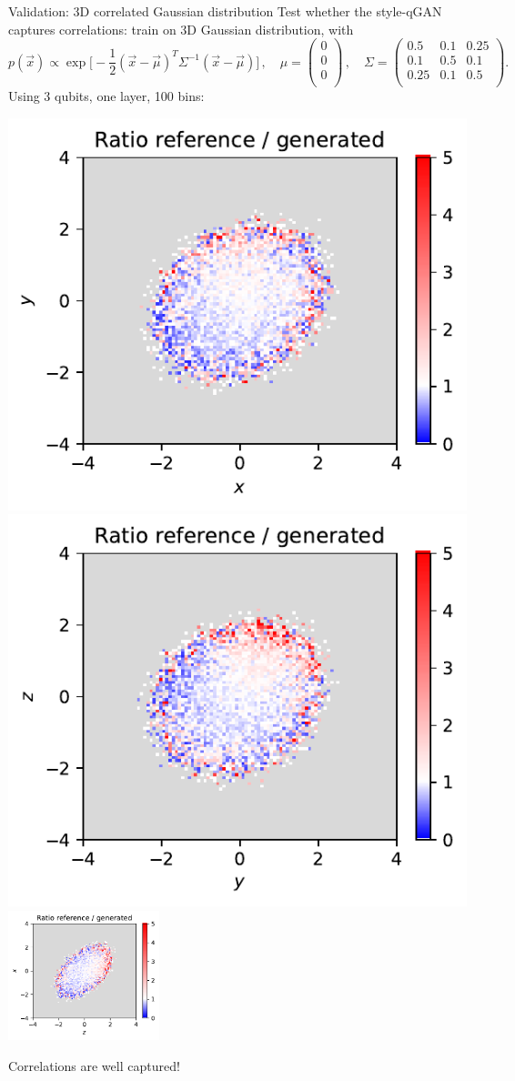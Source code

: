 \documentclass[11pt,aspectratio=169]{beamer}
\begin{document}
\begin{frame}{Validation: 3D correlated Gaussian distribution}
    Test whether the style-qGAN captures correlations: train on 3D Gaussian distribution, with
    \begin{equation*}
        p(\vec{x}) \propto \exp \Big[ - \frac{1}{2} (\vec{x} - \vec{\mu})^T
        \Sigma^{-1} (\vec{x} - \vec{\mu}) \Big] \,, \quad
        \mu =
\begin{pmatrix}
  0 \\
  0 \\
  0 \\
  \end{pmatrix}\,, \quad
        \Sigma =
\begin{pmatrix}
  0.5 & 0.1 & 0.25\\
  0.1 & 0.5 & 0.1\\
  0.25 & 0.1 & 0.5\\
  \end{pmatrix}.
    \end{equation*}
    Using 3 qubits, one layer, 100 bins:
    \begin{multicols*}{3}
        \includegraphics[width=0.33 \textwidth]{figures/plots/3Dgaussian_posdef/1-2_RATIO_100k.pdf}
        \includegraphics[width=0.33 \textwidth]{figures/plots/3Dgaussian_posdef/2-3_RATIO_100k.pdf}
        \includegraphics[width=0.33\textwidth]{figures/plots/3Dgaussian_posdef/3-1_RATIO_100k.pdf}
    \end{multicols*}
    \centering
    Correlations are well captured!
\end{frame}
\end{document}
